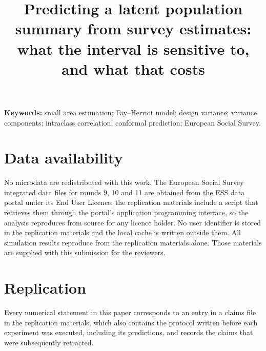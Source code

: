 \documentclass[12pt]{article}
\title{Predicting a latent population summary from survey estimates:\\
what the interval is sensitive to, and what that costs}
\author{}
\date{}
\theoremstyle{definition}
\begin{document}
\maketitle




\begin{center}
\begin{minipage}{0.9\textwidth}
\small
\textbf{Keywords:} small area estimation; Fay--Herriot model; design variance;
variance components; intraclass correlation; conformal prediction; European
Social Survey.
\end{minipage}
\end{center}

\clearpage








\section*{Data availability}

No microdata are redistributed with this work. The European Social Survey
integrated data files for rounds 9, 10 and 11 are obtained from the ESS data
portal under its End User Licence; the replication materials include a script
that retrieves them through the portal's application programming interface, so
the analysis reproduces from source for any licence holder. No user identifier is
stored in the replication materials and the local cache is written outside them.
All simulation results reproduce from the replication materials alone. Those
materials are supplied with this submission for the reviewers.

\section*{Replication}

Every numerical statement in this paper corresponds to an entry in a claims file
in the replication materials, which also contains the protocol written before
each experiment was executed, including its predictions, and records the claims
that were subsequently retracted.


\end{document}
